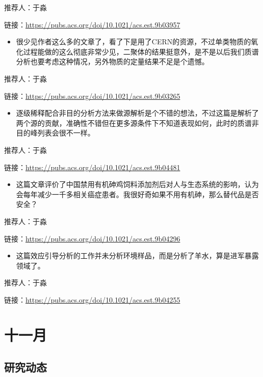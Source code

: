 \documentclass[
]{book}
\providecommand{\tightlist}{%
  \setlength{\itemsep}{0pt}\setlength{\parskip}{0pt}}
\begin{document}
推荐人：于淼

链接：\url{https://pubs.acs.org/doi/10.1021/acs.est.9b03957}

\begin{itemize}
\tightlist
\item
  很少见作者这么多的文章了，看了下是用了CERN的资源，不过单类物质的氧化过程能做的这么彻底非常少见，二聚体的结果挺意外，是不是以后我们质谱分析也要考虑这种情况，另外物质的定量结果不足是个遗憾。
\end{itemize}

推荐人：于淼

链接：\url{https://pubs.acs.org/doi/10.1021/acs.est.9b03265}

\begin{itemize}
\tightlist
\item
  逐级稀释配合非目的分析方法来做源解析是个不错的想法，不过这篇是解析了两个源的贡献，准确性不错但在更多源条件下不知道表现如何，此时的质谱非目的峰列表会很不一样。
\end{itemize}

推荐人：于淼

链接：\url{https://pubs.acs.org/doi/10.1021/acs.est.9b04481}

\begin{itemize}
\tightlist
\item
  这篇文章评价了中国禁用有机砷鸡饲料添加剂后对人与生态系统的影响，认为会每年减少一千多相关癌症患者。我很好奇如果不用有机砷，那么替代品是否安全？
\end{itemize}

推荐人：于淼

链接：\url{https://pubs.acs.org/doi/10.1021/acs.est.9b04296}

\begin{itemize}
\tightlist
\item
  这篇效应引导分析的工作并未分析环境样品，而是分析了羊水，算是进军暴露领域了。
\end{itemize}

推荐人：于淼

链接：\url{https://pubs.acs.org/doi/10.1021/acs.est.9b04255}

\hypertarget{ux5341ux4e00ux6708-2}{%
\section*{十一月}\label{ux5341ux4e00ux6708-2}}

\hypertarget{ux7814ux7a76ux52a8ux6001-24}{%
\subsection*{研究动态}\label{ux7814ux7a76ux52a8ux6001-24}}
\end{document}
